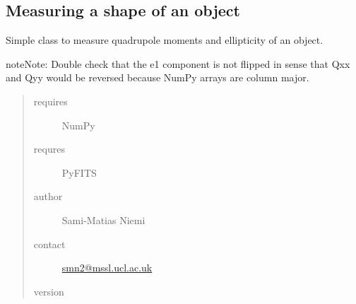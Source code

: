 \documentclass[a4paper,12pt,english]{sphinxmanual}
\begin{document}
\label{analysis:module-analysis.shape}

\subsection{Measuring a shape of an object}
\label{analysis:measuring-a-shape-of-an-object}
Simple class to measure quadrupole moments and ellipticity of an object.

\begin{notice}{note}{Note:}
Double check that the e1 component is not flipped in sense that Qxx and Qyy would be reversed
because NumPy arrays are column major.
\end{notice}
\begin{quote}\begin{description}
\item[{requires}] \leavevmode
NumPy

\item[{requres}] \leavevmode
PyFITS

\item[{author}] \leavevmode
Sami-Matias Niemi

\item[{contact}] \leavevmode
\href{mailto:smn2@mssl.ucl.ac.uk}{smn2@mssl.ucl.ac.uk}

\item[{version}] 

\end{description}\end{quote}
\end{document}
